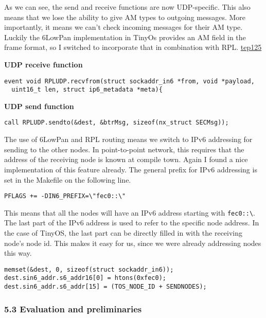 As we can see, the send and receive functions are now UDP-specific. This
also means that we lose the ability to give AM types to outgoing
messages. More importantly, it means we can't check incoming messages
for their AM type. Luckily the 6LowPan implementation in TinyOs provides
an AM field in the frame format, so I switched to incorporate that in
combination with RPL.
\href{http://www.tinyos.net/tinyos-2.x/doc/txt/tep125.txt}{tep125}

\textbf{UDP receive function}

\begin{verbatim}
event void RPLUDP.recvfrom(struct sockaddr_in6 *from, void *payload,
  uint16_t len, struct ip6_metadata *meta){
\end{verbatim}

\textbf{UDP send function}

\begin{verbatim}
call RPLUDP.sendto(&dest, &btrMsg, sizeof(nx_struct SECMsg));
\end{verbatim}

The use of 6LowPan and RPL routing means we switch to IPv6 addressing
for sending to the other nodes. In point-to-point network, this requires
that the address of the receiving node is known at compile town. Again I
found a nice implementation of this feature already. The general prefix
for IPv6 addressing is set in the Makefile on the following line.

\begin{verbatim}
PFLAGS += -DIN6_PREFIX=\"fec0::\"
\end{verbatim}

This means that all the nodes will have an IPv6 address starting with
\texttt{fec0::\textbackslash{}}. The last part of the IPv6 address is
used to refer to the specific node address. In the case of TinyOS, the
last part can be directly filled in with the receiving node's node id.
This makes it easy for us, since we were already addressing nodes this
way.

\begin{verbatim}
memset(&dest, 0, sizeof(struct sockaddr_in6));
dest.sin6_addr.s6_addr16[0] = htons(0xfec0);
dest.sin6_addr.s6_addr[15] = (TOS_NODE_ID + SENDNODES);
\end{verbatim}

\subsubsection{5.3 Evaluation and
preliminaries}\label{evaluation-and-preliminaries}

